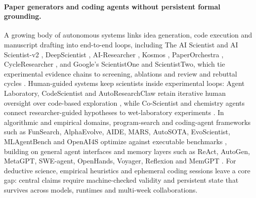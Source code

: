 \documentclass[11pt,a4paper]{article}
\begin{document}
\paragraph{Paper generators and coding agents without persistent formal grounding.}
A growing body of autonomous systems links idea generation, code execution and
manuscript drafting into end-to-end loops, including The AI Scientist and AI
Scientist-v2 \citep{aiscientist,scientistv2}, DeepScientist
\citep{deepscientist}, AI-Researcher \citep{airesearcher}, Kosmos
\citep{kosmos}, PaperOrchestra \citep{paperorchestra}, CycleResearcher
\citep{cycleresearcher}, and Google's ScientistOne and ScientistTwo, which tie
experimental evidence chains to screening, ablations and review and rebuttal
cycles \citep{scientistone,scientisttwo}. Human-guided systems keep scientists
inside experimental loops: Agent Laboratory, CodeScientist and
AutoResearchClaw retain iterative human oversight over code-based exploration
\citep{agentlab,codescientist,autoresearchclaw}, while Co-Scientist and
chemistry agents connect researcher-guided hypotheses to wet-laboratory
experiments \citep{coscientist,boiko2023coscientist,chemcrow}. In algorithmic
and empirical domains, program-search and coding-agent frameworks such as
FunSearch, AlphaEvolve, AIDE, MARS, AutoSOTA, EvoScientist, MLAgentBench and
OpenAI4S optimize against executable benchmarks
\citep{funsearch,alphaevolve,aide,mars,autosota,evoscientist,mlagentbench,openai4s},
building on general agent interfaces and memory layers such as ReAct, AutoGen,
MetaGPT, SWE-agent, OpenHands, Voyager, Reflexion and MemGPT
\citep{react,autogen,metagpt,sweagent,openhands,voyager,reflexion,memgpt}. For
deductive science, empirical heuristics and ephemeral coding sessions leave a
core gap: central claims require machine-checked validity and persistent state
that survives across models, runtimes and multi-week collaborations.
\end{document}

